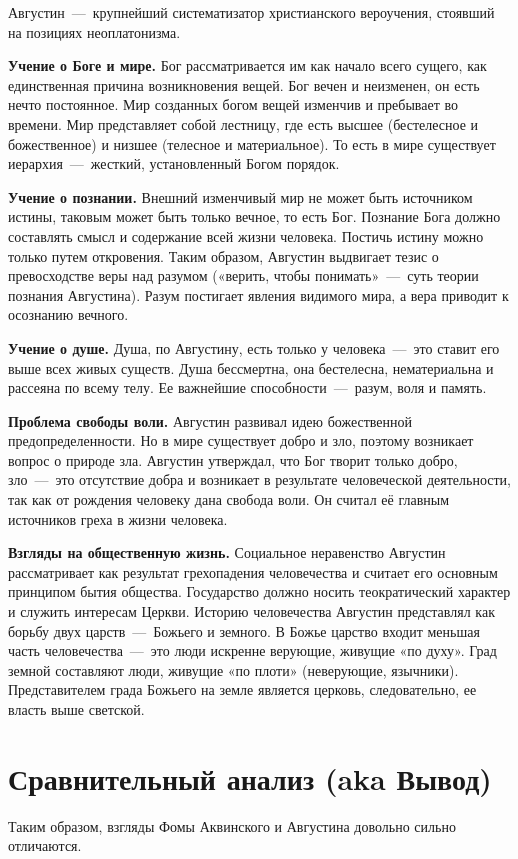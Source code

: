 \documentclass[14pt]{extarticle}
\begin{document}
Августин~---~крупнейший систематизатор христианского вероучения, стоявший на позициях неоплатонизма.

\textbf{Учение о Боге и мире.} Бог рассматривается им как начало всего сущего, как единственная причина возникновения вещей. Бог вечен и неизменен, он есть нечто постоянное. Мир созданных богом вещей изменчив и пребывает во времени. Мир представляет собой лестницу, где есть высшее (бестелесное и божественное) и низшее (телесное и материальное). То есть в мире существует иерархия~---~жесткий, установленный Богом порядок.

\textbf{Учение о познании.} Внешний изменчивый мир не может быть источником истины, таковым может быть только вечное, то есть Бог. Познание Бога должно составлять смысл и содержание всей жизни человека. Постичь истину можно только путем откровения. Таким образом, Августин выдвигает тезис о превосходстве веры над разумом («верить, чтобы понимать»~---~суть теории познания Августина). Разум постигает явления видимого мира, а вера приводит к осознанию вечного.

\textbf{Учение о душе.} Душа, по Августину, есть только у человека~---~это ставит его выше всех живых существ. Душа бессмертна, она бестелесна, нематериальна и рассеяна по всему телу. Ее важнейшие способности~---~разум, воля и память.

\textbf{Проблема свободы воли.} Августин развивал идею божественной предопределенности. Но в мире существует добро и зло, поэтому возникает вопрос о природе зла. Августин утверждал, что Бог творит только добро, зло~---~это отсутствие добра и возникает в результате человеческой деятельности, так как от рождения человеку дана свобода воли. Он считал её главным источников греха в жизни человека.

\textbf{Взгляды на общественную жизнь.} Социальное неравенство Августин рассматривает как результат грехопадения человечества и считает его основным принципом бытия общества. Государство должно носить теократический характер и служить интересам Церкви. Историю человечества Августин представлял как борьбу двух царств~---~Божьего и земного. В Божье царство входит меньшая часть человечества~---~это люди искренне верующие, живущие «по духу». Град земной составляют люди, живущие «по плоти» (неверующие, язычники). Представителем града Божьего на земле является церковь, следовательно, ее власть выше светской. 

\section{Сравнительный анализ (aka Вывод)}
Таким образом, взгляды Фомы Аквинского и Августина довольно сильно отличаются. 
\end{document}
